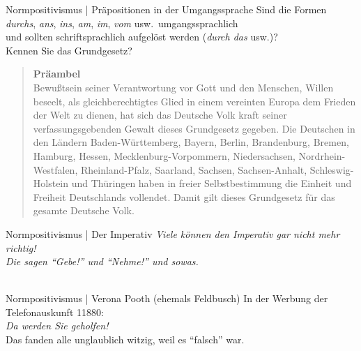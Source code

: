 \begin{frame}
  {Normpositivismus | Präpositionen in der Umgangssprache}
  \onslide<+->
  \onslide<+->
  Sind die Formen \alert{\textit{durchs}, \textit{ans}, \textit{ins}, \textit{am}, \textit{im}, \textit{vom}} usw.\ umgangssprachlich\\
   und sollten schriftsprachlich aufgelöst werden (\textit{durch das} usw.)?\\
  \Halbzeile
  \onslide<+->
  Kennen Sie das Grundgesetz?\\
  \Halbzeile
  \onslide<+->
  \begin{quote}\footnotesize
    \textbf{Präambel}\\
    
     Bewußtsein seiner Verantwortung vor Gott und den Menschen,  Willen beseelt, als gleichberechtigtes Glied in einem vereinten Europa dem Frieden der Welt zu dienen, hat sich das Deutsche Volk kraft seiner verfassungsgebenden Gewalt dieses Grundgesetz gegeben. Die Deutschen in den Ländern Baden-Württemberg, Bayern, Berlin, Brandenburg, Bremen, Hamburg, Hessen, Mecklenburg-Vorpommern, Niedersachsen, Nordrhein-Westfalen, Rheinland-Pfalz, Saarland, Sachsen, Sachsen-Anhalt, Schleswig-Holstein und Thüringen haben in freier Selbstbestimmung die Einheit und Freiheit Deutschlands vollendet. Damit gilt dieses Grundgesetz für das gesamte Deutsche Volk.
  \end{quote}
  \onslide<+->
  \Halbzeile
  \centering 
\end{frame}

\begin{frame}
  {Normpositivismus | Der Imperativ}
  \onslide<+->
  \onslide<+->
  \centering 
  \textit{Viele können den Imperativ gar nicht mehr richtig!}\\
  \Zeile
  \onslide<+->
  \alert{\LARGE\textit{Die sagen "`Gebe!"' und "`Nehme!"' und sowas.}\\}
  \onslide<+->
  \Zeile
  \\
  \onslide<+->
  \Halbzeile
\end{frame}

\begin{frame}
  {Normpositivismus | Verona Pooth (ehemals Feldbusch)}
  \onslide<+->
  \onslide<+->
  \centering 
  In der Werbung der Telefonauskunft 11880:\\
  \Zeile
  \onslide<+->
  \alert{\LARGE\textit{Da werden Sie geholfen!}}\\
  \onslide<+->
  \Zeile
  Das fanden alle unglaublich witzig, weil es "`falsch"' war.\\
  \onslide<+->
  \Zeile
  \centering 
  \\
  \onslide<+->
  \Halbzeile
\end{frame}




